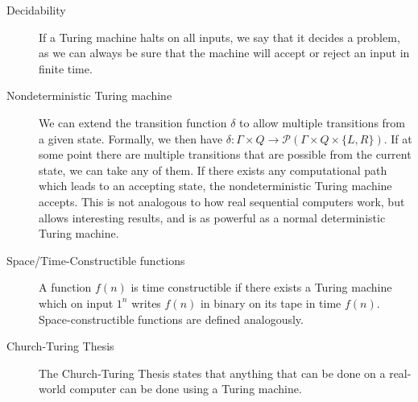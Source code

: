 \begin{description}
    \item[Decidability] If a Turing machine halts on all inputs, we say that it decides a problem, as we can always be sure that the machine will accept or reject an input in finite time.
    \item[Nondeterministic Turing machine] We can extend the transition function $\delta$ to allow multiple transitions from a given state.
    Formally, we then have $\delta : \Gamma \times Q \to \mathcal{P}(\Gamma \times Q \times \{L, R\})$.
    If at some point there are multiple transitions that are possible from the current state, we can take any of them.
    If there exists any computational path which leads to an accepting state, the nondeterministic Turing machine accepts.
    This is not analogous to how real sequential computers work, but allows interesting results, and is as powerful as a normal deterministic Turing machine.
    \item[Space/Time-Constructible functions] A function $f(n)$ is time constructible if there exists a Turing machine which on input $1^{n}$ writes $f(n)$ in binary on its tape in time $f(n)$.
    Space-constructible functions are defined analogously.
    \item[Church-Turing Thesis] The Church-Turing Thesis states that anything that can be done on a real-world computer can be done using a Turing machine.
\end{description}
